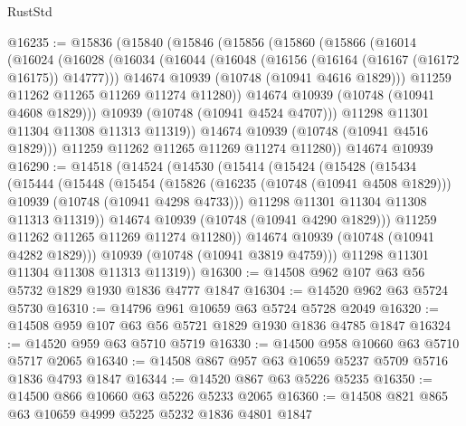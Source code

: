 \begin{lexlean}{RustStd}
\begin{coremodule}
@16235 := @15836
    (@15840
      (@15846
        (@15856
          (@15860
            (@15866
              (@16014
                (@16024
                  (@16028
                    (@16034
                      (@16044
                        (@16048 (@16156 (@16164 (@16167 (@16172 @16175)) @14777)))
                        @14674
                        @10939
                        (@10748 (@10941 @4616 @1829)))
                      @11259
                      @11262
                      @11265
                      @11269
                      @11274
                      @11280))
                  @14674
                  @10939
                  (@10748 (@10941 @4608 @1829)))
                @10939
                (@10748 (@10941 @4524 @4707)))
              @11298
              @11301
              @11304
              @11308
              @11313
              @11319))
          @14674
          @10939
          (@10748 (@10941 @4516 @1829)))
        @11259
        @11262
        @11265
        @11269
        @11274
        @11280))
    @14674
    @10939
@16290 := @14518
    (@14524
      (@14530
        (@15414
          (@15424
            (@15428
              (@15434
                (@15444
                  (@15448
                    (@15454
                      (@15826
                        (@16235 (@10748 (@10941 @4508 @1829)))
                        @10939
                        (@10748 (@10941 @4298 @4733)))
                      @11298
                      @11301
                      @11304
                      @11308
                      @11313
                      @11319))
                  @14674
                  @10939
                  (@10748 (@10941 @4290 @1829)))
                @11259
                @11262
                @11265
                @11269
                @11274
                @11280))
            @14674
            @10939
            (@10748 (@10941 @4282 @1829)))
          @10939
          (@10748 (@10941 @3819 @4759)))
        @11298
        @11301
        @11304
        @11308
        @11313
        @11319))
@16300 := @14508 @962 @107 @63 @56 @5732 @1829 @1930 @1836 @4777 @1847
@16304 := @14520 @962 @63 @5724 @5730
@16310 := @14796 @961 @10659 @63 @5724 @5728 @2049
@16320 := @14508 @959 @107 @63 @56 @5721 @1829 @1930 @1836 @4785 @1847
@16324 := @14520 @959 @63 @5710 @5719
@16330 := @14500 @958 @10660 @63 @5710 @5717 @2065
@16340 := @14508 @867 @957 @63 @10659 @5237 @5709 @5716 @1836 @4793 @1847
@16344 := @14520 @867 @63 @5226 @5235
@16350 := @14500 @866 @10660 @63 @5226 @5233 @2065
@16360 := @14508 @821 @865 @63 @10659 @4999 @5225 @5232 @1836 @4801 @1847

\end{coremodule}
\end{lexlean}
